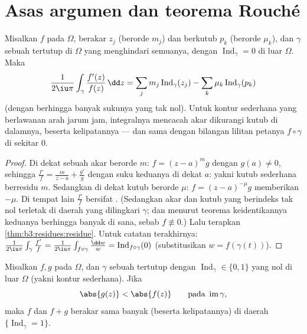 \section{Asas argumen dan teorema Rouché}

\begin{theorem}
\label{thm:b3:residues:argument}
Misalkan $f$  pada $\Omega$, berakar $z_j$ (berorde
$m_j$) dan berkutub $p_k$ (berorde $\mu_k$), dan $\gamma$ sebuah 
tertutup di $\Omega$ yang menghindari semuanya, dengan
$\operatorname{Ind}_\gamma = 0$ di luar $\Omega$. Maka
\[
\frac1{2\iu\pi}\int_\gamma\frac{f'(z)}{f(z)}\,\dd z
= \sum_j m_j\operatorname{Ind}_\gamma(z_j)
- \sum_k \mu_k\operatorname{Ind}_\gamma(p_k)
\]
(dengan berhingga banyak sukunya yang tak nol). Untuk kontur sederhana
yang berlawanan arah jarum jam, integralnya mencacah akar dikurangi
kutub di dalamnya, beserta kelipatannya --- dan sama dengan bilangan
lilitan  petanya $f\circ\gamma$ di sekitar $0$.
\end{theorem}

\begin{proof}
Di dekat sebuah akar berorde $m$: $f = (z-a)^mg$ dengan $g(a) \neq 0$, sehingga
$\frac{f'}f = \frac m{z - a} + \frac{g'}g$ dengan suku keduanya
 di dekat $a$: yakni kutub sederhana berresidu $m$. Sedangkan di dekat
kutub berorde $\mu$: $f = (z-a)^{-\mu}g$ memberikan 
$-\mu$. Di tempat lain $\frac{f'}f$ bersifat . (Sedangkan akar dan
kutub yang berindeks tak nol terletak di daerah  yang dilingkari
$\gamma$; dan menurut teorema keidentikannya keduanya berhingga banyak
di sana, sebab $f \not\equiv 0$.) Lalu terapkan
\cref{thm:b3:residues:residue}. Untuk catatan terakhirnya:
$\frac1{2\iu\pi}\int_\gamma\frac{f'}f =
\frac1{2\iu\pi}\int_{f\circ\gamma}\frac{\dd w}w =
\operatorname{Ind}_{f\circ\gamma}(0)$ (substitusikan $w =
f(\gamma(t))$).
\end{proof}

\begin{theorem}[Rouché]\label{thm:b3:residues:rouche}
Misalkan $f, g$  pada $\Omega$, dan $\gamma$ sebuah 
tertutup dengan $\operatorname{Ind}_\gamma \in \{0,1\}$ yang nol di luar
$\Omega$ (yakni kontur sederhana). Jika
\[
\abs{g(z)} < \abs{f(z)} \qquad \text{pada }
\operatorname{im}\gamma,
\]
maka $f$ dan $f + g$ berakar sama banyak (beserta
kelipatannya) di daerah $\{\operatorname{Ind}_\gamma =
1\}$.
\end{theorem}

